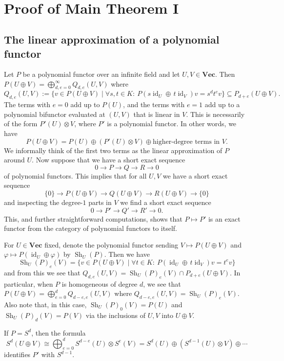 \documentclass{amsart}
\theoremstyle{plain}
\theoremstyle{definition}
\DeclareMathOperator{\id}{id}
\renewcommand{\phi}{\varphi}
\DeclareMathOperator{\Sh}{Sh}
\renewcommand{\Vec}{\mathbf{Vec}}
\begin{document}
\section{Proof of Main Theorem I} \label{sec:ProofI}

\subsection{The linear approximation of a polynomial functor}
\label{ssec:Derivative}

Let $P$ be a polynomial functor over an infinite field and let $U,V
\in \Vec$. Then $P(U \oplus V) = \bigoplus_{d,e=0}^{\infty}
Q_{d,e}(U,V)$ where
\[
Q_{d,e}(U,V):=\{v \in P(U \oplus V) \mid \forall s,t \in K: \ P(s\id_U \oplus\, t\id_V)v = s^d t^e v \}\subseteq P_{d+e}(U\oplus V).
\]
The terms with $e=0$ add up to $P(U)$, and the terms with $e=1$ add up
to a polynomial bifunctor evaluated at $(U,V)$ that is linear in $V$.
This is necessarily of the form $P'(U) \otimes V$, where $P'$ is a
polynomial functor. In other words, we have
\[ P(U \oplus V)=P(U) \oplus (P'(U) \otimes V) \oplus \text{
higher-degree terms in }V. \]
We informally think of the first two terms as the linear approximation
of $P$ around $U$.  Now suppose that we have a
short exact sequence
\[ 0 \to P \to Q \to R \to 0 \]
of polynomial functors. This implies that for all $U,V$ we have a short
exact sequence
\[ \{0\} \to P(U \oplus V) \to Q(U \oplus V) \to R(U \oplus V) \to \{0\} \]
and inspecting the degree-$1$ parts in $V$ we find a short
exact sequence
\[ 0 \to P' \to Q' \to R' \to 0. \]
This, and further straightforward computations, shows that $P \mapsto P'$
is an exact functor from the category of polynomial functors to itself.

\begin{re}
For $U\in\Vec$ fixed, denote the polynomial functor sending $V\mapsto P(U\oplus V)$ and $\phi\mapsto P(\id_U\oplus \phi)$ by $\Sh_U(P)$. Then we have
\[
\Sh_U(P)_e(V)=\{v \in P(U \oplus V) \mid \forall t \in K: \ P(\id_U \oplus\, t\id_V)v = t^e v \}
\]
and from this we see that $Q_{d,e}(U,V)=\Sh_U(P)_e(V)\cap P_{d+e}(U\oplus V)$. In particular, when $P$ is homogeneous of degree $d$, we see that $P(U\oplus V)=\bigoplus_{e=0}^d Q_{d-e,e}(U,V)$ where $Q_{d-e,e}(U,V)=\Sh_U(P)_e(V)$. Also note that, in this case, $\Sh_U(P)_0(V)=P(U)$ and $\Sh_U(P)_d(V)=P(V)$ via the inclusions of $U,V$ into $U\oplus V$.
\end{re}

\begin{ex}
If $P=S^d$, then the formula
\[
S^d(U \oplus V) \cong \bigoplus_{e=0}^d S^{d-e}(U) \otimes S^e(V)
=S^d (U) \oplus (S^{d-1} (U) \otimes V) \oplus\cdots
\]
identifies $P'$ with $S^{d-1}$.
\end{ex}
\end{document}
